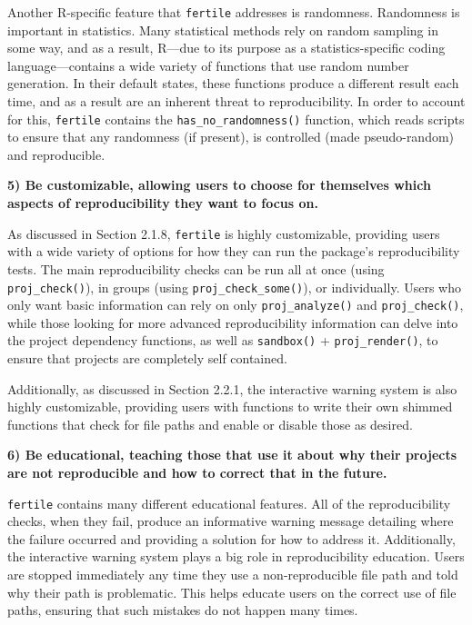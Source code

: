 \documentclass[12pt,twoside]{reedthesis}
\begin{document}
Another R-specific feature that \texttt{fertile} addresses is randomness. Randomness is important in statistics. Many statistical methods rely on random sampling in some way, and as a result, R---due to its purpose as a statistics-specific coding language---contains a wide variety of functions that use random number generation. In their default states, these functions produce a different result each time, and as a result are an inherent threat to reproducibility. In order to account for this, \texttt{fertile} contains the \texttt{has\_no\_randomness()} function, which reads scripts to ensure that any randomness (if present), is controlled (made pseudo-random) and reproducible.

\textbf{5) Be customizable, allowing users to choose for themselves which aspects of reproducibility they want to focus on.}

As discussed in Section 2.1.8, \texttt{fertile} is highly customizable, providing users with a wide variety of options for how they can run the package's reproducibility tests. The main reproducibility checks can be run all at once (using \texttt{proj\_check()}), in groups (using \texttt{proj\_check\_some()}), or individually. Users who only want basic information can rely on only \texttt{proj\_analyze()} and \texttt{proj\_check()}, while those looking for more advanced reproducibility information can delve into the project dependency functions, as well as \texttt{sandbox()} + \texttt{proj\_render()}, to ensure that projects are completely self contained.

Additionally, as discussed in Section 2.2.1, the interactive warning system is also highly customizable, providing users with functions to write their own shimmed functions that check for file paths and enable or disable those as desired.

\textbf{6) Be educational, teaching those that use it about why their projects are not reproducible and how to correct that in the future.}

\texttt{fertile} contains many different educational features. All of the reproducibility checks, when they fail, produce an informative warning message detailing where the failure occurred and providing a solution for how to address it. Additionally, the interactive warning system plays a big role in reproducibility education. Users are stopped immediately any time they use a non-reproducible file path and told why their path is problematic. This helps educate users on the correct use of file paths, ensuring that such mistakes do not happen many times.
\end{document}
